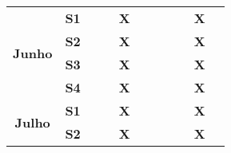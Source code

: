\begin{table}[]
\begin{tabular}{|clllclllllllllll|}
\\ \hline
\multicolumn{4}{|c|}{\multirow{4}{*}{\textbf{Junho}}}    & \multicolumn{3}{c|}{\textbf{S1}}                      & \multicolumn{1}{l|}{\textbf{}}  & \multicolumn{1}{l|}{\textbf{}}  & \multicolumn{1}{l|}{\textbf{X}} & \multicolumn{1}{l|}{\textbf{}}  & \multicolumn{1}{l|}{\textbf{}}  & \multicolumn{1}{l|}{\textbf{}}  & \multicolumn{1}{l|}{\textbf{}}  & \multicolumn{1}{l|}{\textbf{X}}
\\ \cline{5-15} 
\multicolumn{4}{|c|}{}                                   & \multicolumn{3}{c|}{\textbf{S2}}                      & \multicolumn{1}{l|}{\textbf{}}  & \multicolumn{1}{l|}{\textbf{}}  & \multicolumn{1}{l|}{\textbf{X}}  & \multicolumn{1}{l|}{\textbf{}} & \multicolumn{1}{l|}{\textbf{}}  & \multicolumn{1}{l|}{\textbf{}}  & \multicolumn{1}{l|}{\textbf{}}  & \multicolumn{1}{l|}{\textbf{X}}  \\ \cline{5-15} 
\multicolumn{4}{|c|}{}                                   & \multicolumn{3}{c|}{\textbf{S3}}                      & \multicolumn{1}{l|}{\textbf{}}  & \multicolumn{1}{l|}{\textbf{}}  & \multicolumn{1}{l|}{\textbf{X}}  & \multicolumn{1}{l|}{\textbf{}} & \multicolumn{1}{l|}{\textbf{}}  & \multicolumn{1}{l|}{\textbf{}}  & \multicolumn{1}{l|}{\textbf{}}  & \multicolumn{1}{l|}{\textbf{X}}
\\ \cline{5-15} 
\multicolumn{4}{|c|}{}                                   & \multicolumn{3}{c|}{\textbf{S4}}                      & \multicolumn{1}{l|}{\textbf{}}  & \multicolumn{1}{l|}{\textbf{}}  & \multicolumn{1}{l|}{\textbf{X}}  & \multicolumn{1}{l|}{\textbf{}} & \multicolumn{1}{l|}{\textbf{}}  & \multicolumn{1}{l|}{\textbf{}}  & \multicolumn{1}{l|}{\textbf{}}  & \multicolumn{1}{l|}{\textbf{X}}
\\ \hline
\multicolumn{4}{|c|}{\multirow{4}{*}{\textbf{Julho}}}    & \multicolumn{3}{c|}{\textbf{S1}}                      & \multicolumn{1}{l|}{\textbf{}}  & \multicolumn{1}{l|}{\textbf{}}  & \multicolumn{1}{l|}{\textbf{X}}  & \multicolumn{1}{l|}{\textbf{}}  & \multicolumn{1}{l|}{\textbf{}} & \multicolumn{1}{l|}{\textbf{}}  & \multicolumn{1}{l|}{\textbf{}}  & \multicolumn{1}{l|}{\textbf{X}}
\\ \cline{5-15} 
\multicolumn{4}{|c|}{}                                   & \multicolumn{3}{c|}{\textbf{S2}}                      & \multicolumn{1}{l|}{\textbf{}}  & \multicolumn{1}{l|}{\textbf{}}  & \multicolumn{1}{l|}{\textbf{X}}  & \multicolumn{1}{l|}{\textbf{}}  & \multicolumn{1}{l|}{\textbf{}} & \multicolumn{1}{l|}{\textbf{}}  & \multicolumn{1}{l|}{\textbf{}}  & \multicolumn{1}{l|}{\textbf{X}}

\end{tabular}
\end{table}
